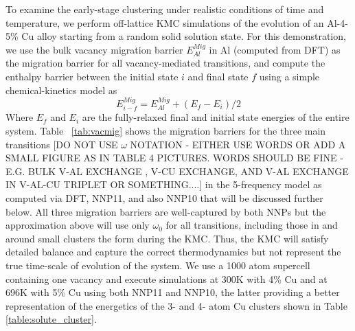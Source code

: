 \documentclass{article}
\begin{document}
To examine the early-stage clustering under realistic conditions of time and temperature, we perform off-lattice KMC simulations of the evolution of an Al-4-5\% Cu alloy starting from a random solid solution state.  For this demonstration, we use the bulk vacancy migration barrier $E^{Mig}_{Al}$ in Al (computed from DFT) as the migration barrier for all vacancy-mediated transitions, and compute the enthalpy barrier between the initial state $i$ and final state $f$ using a simple chemical-kinetics model as
\begin{equation}
E^{Mig}_{i-f}= E^{Mig}_{Al} + (E_{f} - E_{i})/2
\end{equation}
Where $E_{f}$ and $E_{i}$ are the fully-relaxed final and initial state energies of the entire system.  Table ~\ref{tab:vacmig} shows the migration barriers for the three main transitions [DO NOT USE $\omega$ NOTATION - EITHER USE WORDS OR ADD A SMALL FIGURE AS IN TABLE 4 PICTURES.  WORDS SHOULD BE FINE - E.G. BULK V-AL EXCHANGE , V-CU EXCHANGE, AND V-AL EXCHANGE IN V-AL-CU TRIPLET OR SOMETHING....]  in the 5-frequency model as computed via DFT\cite{Mantina2009FirstCoefficients}, NNP11, and also NNP10 that will be discussed further below.  All three migration barriers are well-captured by both NNPs but the approximation above will use only $\omega_0$ for all transitions, including those in and around small clusters the form during the KMC.  Thus, the KMC will satisfy detailed balance and capture the correct thermodynamics but not represent the true time-scale of evolution\cite{Mantina2009FirstCoefficients} of the system. We use a 1000 atom supercell containing one vacancy and execute simulations at 300K with 4\% Cu and at 696K with 5\% Cu using both NNP11 and NNP10, the latter providing a better representation of the energetics of the 3- and 4- atom Cu clusters shown in Table \ref{table:solute_cluster}.
\end{document}
